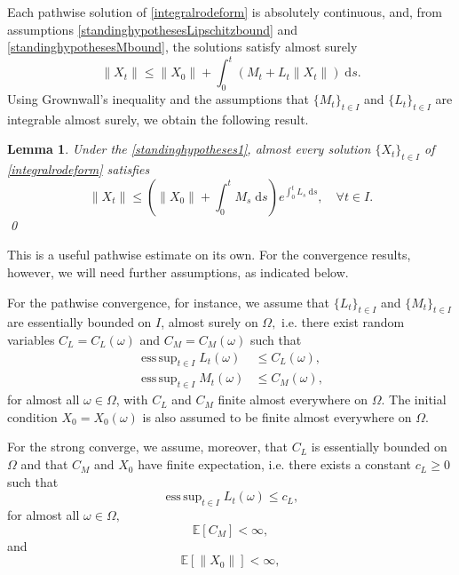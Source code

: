 \documentclass[reqno,12pt]{amsart}
\theoremstyle{plain} %
\newtheorem{lemma}{Lemma}[section]
\theoremstyle{definition} %
\begin{document}
Each pathwise solution of \eqref{integralrodeform} is absolutely continuous, and, from assumptions \eqref{standinghypothesesLipschitzbound} and \eqref{standinghypothesesMbound}, the solutions satisfy almost surely
\[
    \|X_t\| \leq \|X_0\| + \int_0^t (M_t + L_t\|X_t\|)\;\mathrm{d}s.
\]
Using Grownwall's inequality and the assumptions that $\{M_t\}_{t\in I}$ and $\{L_t\}_{t\in I}$ are integrable almost surely, we obtain the following result.
\begin{lemma}
    Under the \cref{standinghypotheses1}, almost every solution $\{X_t\}_{t\in I}$ of \eqref{integralrodeform} satisfies
    \begin{equation}
        \label{XtboundLXMt}
        \|X_t\| \leq \left(\|X_0\| + \int_0^t M_s\;\mathrm{d}s\right) e^{\int_0^t L_s\;\mathrm{d}s}, \quad \forall t\in I.
    \end{equation}
    \qed
\end{lemma}

This is a useful pathwise estimate on its own. For the convergence results, however, we will need further assumptions, as indicated below.

For the pathwise convergence, for instance, we assume that $\{L_t\}_{t\in I}$ and $\{M_t\}_{t\in I}$ are essentially bounded on $I$, almost surely on $\Omega,$ i.e. there exist random variables $C_L=C_L(\omega)$ and $C_M=C_M(\omega)$ such that
\begin{align}
    \label{esssuponLt}
    \operatorname{ess\,sup}_{t\in I} L_t(\omega) & \leq C_L(\omega), \\
    \label{esssuponMt}
    \operatorname{ess\,sup}_{t\in I} M_t(\omega) & \leq C_M(\omega),
\end{align}
for almost all $\omega\in\Omega$, with $C_L$ and $C_M$ finite almost everywhere on $\Omega.$ The initial condition $X_0=X_0(\omega)$ is also assumed to be finite almost everywhere on $\Omega.$

For the strong converge, we assume, moreover, that $C_L$ is essentially bounded on $\Omega$ and that $C_M$ and $X_0$ have finite expectation, i.e. there exists a constant $c_L \geq 0$ such that
\begin{equation}
    \label{LtLXbound}
    \operatorname{ess\,sup}_{t\in I} L_t(\omega) \leq c_L,
\end{equation}
for almost all $\omega\in \Omega,$
\begin{equation}
    \label{CMmeanbound}
    \mathbb{E}\left[C_M\right] < \infty,
\end{equation}
and
\begin{equation}
    \label{EX0strongbound}
    \mathbb{E}[\|X_0\|] < \infty,
\end{equation}
\end{document}
